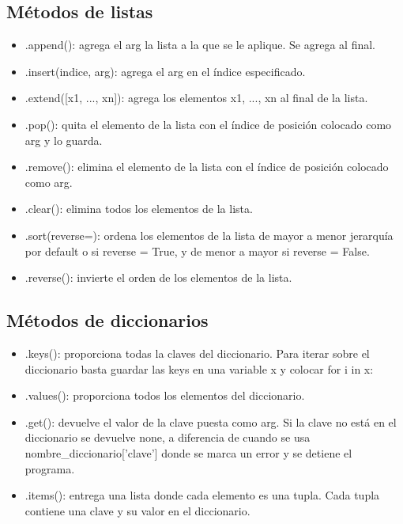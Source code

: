 \documentclass[10pt,oneside]{article}
\begin{document}
\begin{multicols}{2}
        \subsection{Métodos de listas}  
        
            \begin{itemize}
                \item .append(): agrega el arg la lista a la que se le aplique. Se agrega al final.
                \item .insert(indice, arg): agrega el arg en el índice especificado.
                \item .extend([x1, ..., xn]): agrega los elementos x1, ..., xn al final de la lista.
                \item .pop(): quita el elemento de la lista con el índice de posición colocado como arg y lo guarda. 
                \item .remove(): elimina el elemento de la lista con el índice de posición colocado como arg.
                \item .clear(): elimina todos los elementos de la lista.
                \item .sort(reverse=): ordena los elementos de la lista de mayor a menor jerarquía por default o si reverse = True, y de menor a mayor si reverse = False.
                \item .reverse(): invierte el orden de los elementos de la lista. 
            \end{itemize}

        \subsection{Métodos de diccionarios}

        \begin{itemize}
            \item .keys(): proporciona todas la claves del diccionario. Para iterar sobre el diccionario basta guardar las keys en una variable x y colocar for i in x:
            \item .values(): proporciona todos los elementos del diccionario. 
            \item .get(): devuelve el valor de la clave puesta como arg. Si la clave no está en el diccionario se devuelve none, a diferencia de cuando se usa nombre\_diccionario['clave'] donde se marca un error y se detiene el programa.
            \item .items(): entrega una lista donde cada elemento es una tupla. Cada tupla contiene una clave y su valor en el diccionario.          
        \end{itemize}
        

\end{multicols}
\end{document}
